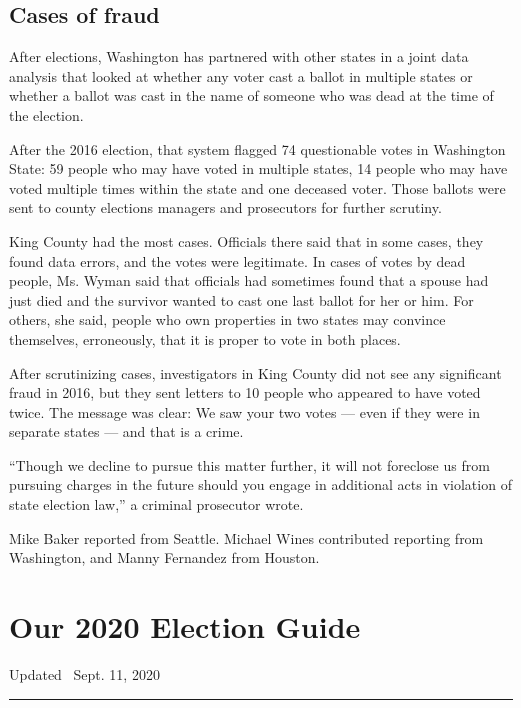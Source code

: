 \hypertarget{cases-of-fraud}{%
\subsection{Cases of fraud}\label{cases-of-fraud}}

After elections, Washington has partnered with other states in a joint
data analysis that looked at whether any voter cast a ballot in multiple
states or whether a ballot was cast in the name of someone who was dead
at the time of the election.

After the 2016 election, that system flagged 74 questionable votes in
Washington State: 59 people who may have voted in multiple states, 14
people who may have voted multiple times within the state and one
deceased voter. Those ballots were sent to county elections managers and
prosecutors for further scrutiny.

King County had the most cases. Officials there said that in some cases,
they found data errors, and the votes were legitimate. In cases of votes
by dead people, Ms. Wyman said that officials had sometimes found that a
spouse had just died and the survivor wanted to cast one last ballot for
her or him. For others, she said, people who own properties in two
states may convince themselves, erroneously, that it is proper to vote
in both places.

After scrutinizing cases, investigators in King County did not see any
significant fraud in 2016, but they sent letters to 10 people who
appeared to have voted twice. The message was clear: We saw your two
votes --- even if they were in separate states --- and that is a crime.

``Though we decline to pursue this matter further, it will not foreclose
us from pursuing charges in the future should you engage in additional
acts in violation of state election law,'' a criminal prosecutor wrote.

Mike Baker reported from Seattle. Michael Wines contributed reporting
from Washington, and Manny Fernandez from Houston.

\hypertarget{our-2020-election-guide}{%
\section{Our 2020 Election Guide}\label{our-2020-election-guide}}

Updated ~Sept. 11, 2020

\begin{center}\rule{0.5\linewidth}{\linethickness}\end{center}

